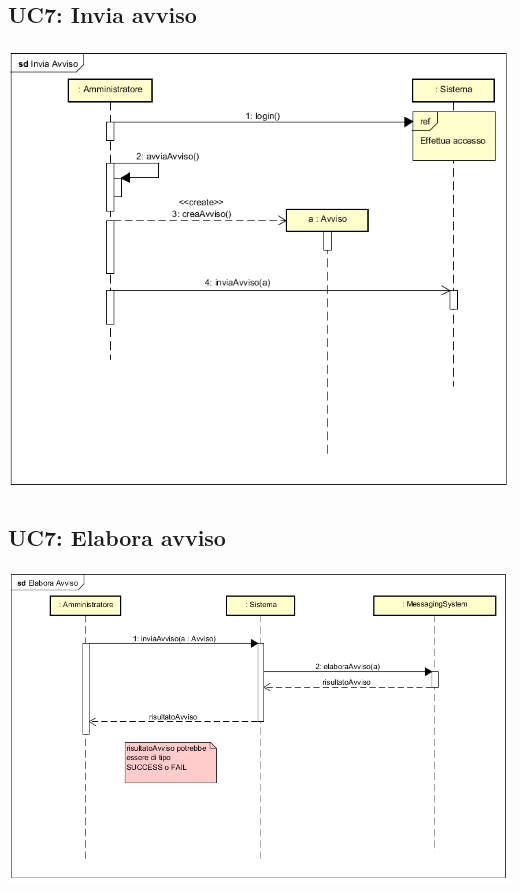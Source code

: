 \documentclass[12pt]{report}
\begin{document}
	\subsection{UC7: Invia avviso}
	\begin{center}
		\includegraphics{./images/InviaAvviso.png}
	\end{center}
	
	\subsection{UC7: Elabora avviso}
	\begin{center}
		\includegraphics[scale = 0.8]{./images/ElaboraAvviso.png}
	\end{center}
\end{document}
